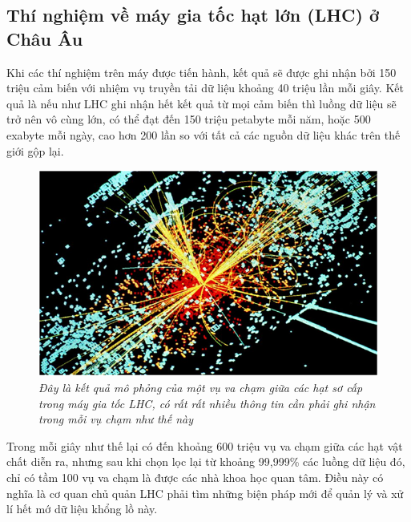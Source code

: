 \documentclass[12pt]{report}
\begin{document}
\subsection{Thí nghiệm về máy gia tốc hạt lớn (LHC) ở Châu Âu}
Khi các thí nghiệm trên máy được tiến hành, kết quả sẽ được ghi nhận bởi 150 triệu cảm biến với nhiệm vụ truyền tải dữ liệu khoảng 40 triệu lần mỗi giây. Kết quả là nếu như LHC ghi nhận hết kết quả từ mọi cảm biến thì luồng dữ liệu sẽ trở nên vô cùng lớn, có thể đạt đến 150 triệu petabyte mỗi năm, hoặc 500 exabyte mỗi ngày, cao hơn 200 lần so với tất cả các nguồn dữ liệu khác trên thế giới gộp lại.

\begin{figure}[H]
\centering
\includegraphics[scale=1]{lhc.png}
\caption{\it Đây là kết quả mô phỏng của một vụ va chạm giữa các hạt sơ cấp trong máy gia tốc LHC, có rất rất nhiều thông tin cần phải ghi nhận trong mỗi vụ chạm như thế này}
\end{figure}

Trong mỗi giây như thế lại có đến khoảng 600 triệu vụ va chạm giữa các hạt vật chất diễn ra, nhưng sau khi chọn lọc lại từ khoảng 99,999\% các luồng dữ liệu đó, chỉ có tầm 100 vụ va chạm là được các nhà khoa học quan tâm. Điều này có nghĩa là cơ quan chủ quản LHC phải tìm những biện pháp mới để quản lý và xử lí hết mớ dữ liệu khổng lồ này.
\end{document}
